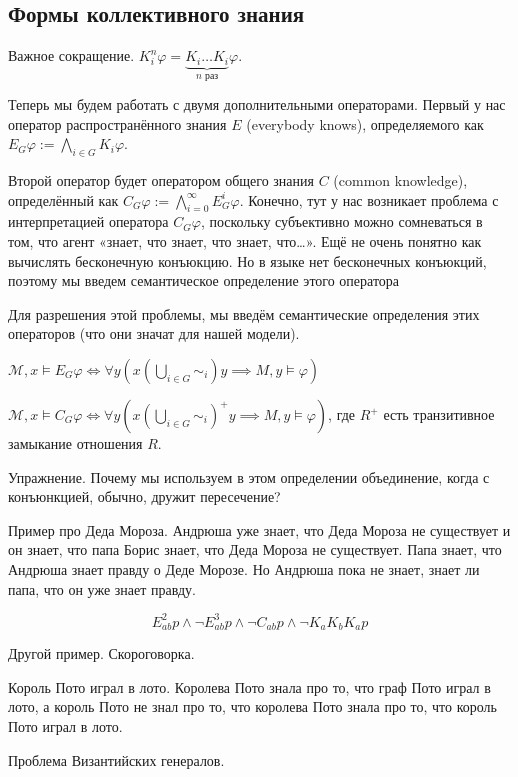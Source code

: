 \documentclass[openany]{book}
\theoremstyle{plain}
\theoremstyle{definition}
\begin{document}
\subsection{Формы коллективного знания}

Важное сокращение. \(K_i^n \varphi = \underbrace{K_i \dots K_i}_{n \text{ раз}} \varphi\).

Теперь мы будем работать с двумя дополнительными операторами. Первый у нас оператор распространённого знания \(E\) (everybody knows), определяемого как  \(E_G \varphi := \bigwedge_{i \in G} K_i \varphi\).

Второй оператор будет оператором общего знания \(C\) (common knowledge), определённый как \(C_G \varphi := \bigwedge_{i=0}^{\infty} E_G^i \varphi\). Конечно, тут у нас возникает проблема с интерпретацией оператора \(C_G \varphi\), поскольку субъективно можно сомневаться в том, что агент «знает, что знает, что знает, что\dots». Ещё не очень понятно как вычислять бесконечную конъюкцию. Но в языке нет бесконечных конъюкций, поэтому мы введем семантическое определение этого оператора

Для разрешения этой проблемы, мы введём семантические определения этих операторов (что они значат для нашей модели).

\(\mathcal{M}, x \models E_G \varphi \Leftrightarrow \forall y (x (\bigcup_{i \in G} \sim_i)y \implies M, y \models \varphi)\)

\(\mathcal{M}, x \models C_G \varphi \Leftrightarrow \forall y (x (\bigcup_{i\in G} \sim_i)^+ y \implies M,y \models \varphi)\), где \(R^+\) есть транзитивное замыкание отношения \(R\).

Упражнение. Почему мы используем в этом определении объединение, когда с конъюнкцией, обычно, дружит пересечение?

Пример про Деда Мороза. Андрюша уже знает, что Деда Мороза не существует и он знает, что папа Борис знает, что Деда Мороза не существует. Папа знает, что Андрюша знает правду о Деде Морозе. Но Андрюша пока не знает, знает ли папа, что он уже знает правду.

\[E^2_{ab} p \land \neg E^3_{ab} p \land \neg C_{ab} p \land \neg K_a K_b K_a p\]

Другой пример. Скороговорка.

Король Пото играл в лото. Королева Пото знала про то, что граф Пото играл в лото, 
а король Пото не знал про то, что королева Пото знала про то, что король Пото играл в лото.

Проблема Византийских генералов.
\end{document}
